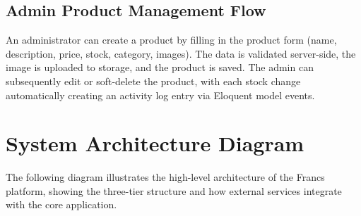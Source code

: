 \subsection{Admin Product Management Flow}
An administrator can create a product by filling in the product form (name, description, price, stock, category, images). The data is validated server-side, the image is uploaded to storage, and the product is saved. The admin can subsequently edit or soft-delete the product, with each stock change automatically creating an activity log entry via Eloquent model events.

\section{System Architecture Diagram}
The following diagram illustrates the high-level architecture of the Francs platform, showing the three-tier structure and how external services integrate with the core application.

